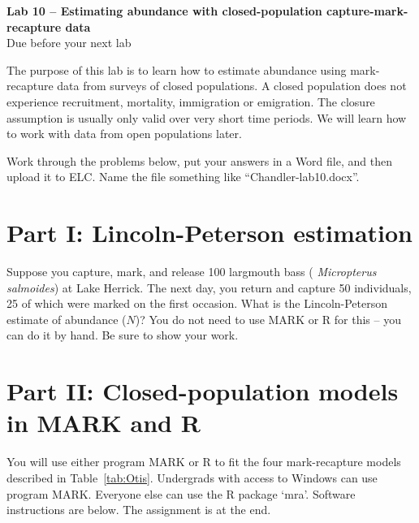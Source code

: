 \documentclass[12pt]{article}\usepackage[]{graphicx}\usepackage[]{color}
\begin{document}
{
  \Large
  \centering
  {\bf Lab 10 -- Estimating abundance with
    closed-population capture-mark-recapture data} \\
  Due before your next lab \par
}

\vspace{10pt}


The purpose of this lab is to learn how to estimate abundance using
mark-recapture data from surveys of closed populations. A closed
population does not experience recruitment, mortality, immigration or
emigration. The closure assumption is usually only valid over very
short time periods. We will learn how to work with data from open
populations later.

Work through the problems below, put your answers in a Word file,
and then upload it to ELC. Name the file something like
``Chandler-lab10.docx''.  





\section*{\large Part I: Lincoln-Peterson estimation}
Suppose you capture, mark, and release 100 largmouth bass ({\it
  Micropterus salmoides}) at Lake Herrick. The next day, you return
and capture 50 individuals, 25 of which were marked on the first
occasion. What is the Lincoln-Peterson estimate of abundance ($N$)?
You do not need to use MARK or R for this -- you can do it by
hand. Be sure to show your work.  





\section*{\large  Part II: Closed-population models in MARK and R}

You will use either program MARK or R to fit the four mark-recapture
models described in Table~\ref{tab:Otis}. Undergrads with access to
Windows can use program MARK. Everyone else can use the R package
`mra'. Software instructions are below. The assignment is at the end.  
\end{document}
